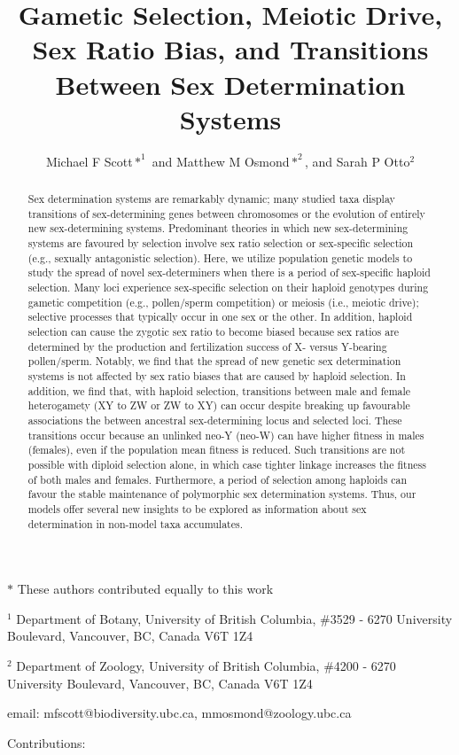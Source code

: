 \documentclass[12pt]{article}
\begin{document}
\title{Gametic Selection, Meiotic Drive, Sex Ratio Bias, and Transitions Between Sex Determination Systems}
\author{Michael F Scott$*^1$ and Matthew M Osmond$*^2$, and Sarah P Otto$^2$}
\date{}
\maketitle
\noindent
$*$ These authors contributed equally to this work

\noindent
$^1$ Department of Botany, University of British Columbia, \#3529 - 6270 University Boulevard, Vancouver, BC, Canada V6T 1Z4

\noindent
$^2$ Department of Zoology, University of British Columbia, \#4200 - 6270 University Boulevard, Vancouver, BC, Canada V6T 1Z4

\noindent
email: mfscott@biodiversity.ubc.ca, mmosmond@zoology.ubc.ca

\noindent
Contributions: 

\newpage
\linenumbers
\modulolinenumbers[2]

\begin{abstract}
Sex determination systems are remarkably dynamic; many studied taxa display transitions of sex-determining genes between chromosomes or the evolution of entirely new sex-determining systems. 
Predominant theories in which new sex-determining systems are favoured by selection involve sex ratio selection or sex-specific selection (e.g., sexually antagonistic selection). 
Here, we utilize population genetic models to study the spread of novel sex-determiners when there is a period of sex-specific haploid selection. 
Many loci experience sex-specific selection on their haploid genotypes during gametic competition (e.g., pollen/sperm competition) or meiosis (i.e., meiotic drive); selective processes that typically occur in one sex or the other.
In addition, haploid selection can cause the zygotic sex ratio to become biased because sex ratios are determined by the production and fertilization success of X- versus Y-bearing pollen/sperm. 
Notably, we find that the spread of new genetic sex determination systems is not affected by sex ratio biases that are caused by haploid selection. 
In addition, we find that, with haploid selection, transitions between male and female heterogamety (XY to ZW or ZW to XY) can occur despite breaking up favourable associations the between ancestral sex-determining locus and selected loci.
These transitions occur because an unlinked neo-Y (neo-W) can have higher fitness in males (females), even if the population mean fitness is reduced. 
Such transitions are not possible with diploid selection alone, in which case tighter linkage increases the fitness of both males and females. 
Furthermore, a period of selection among haploids can favour the stable maintenance of polymorphic sex determination systems. 
Thus, our models offer several new insights to be explored as information about sex determination in non-model taxa accumulates.
\end{abstract}
\end{document}
